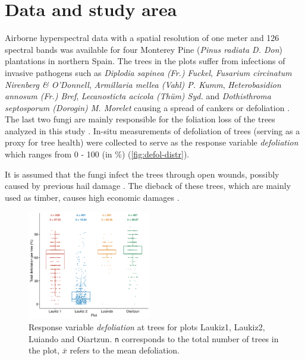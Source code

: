 \documentclass[peerreview]{IEEEtran}
\begin{document}
\section{Data and study area}

Airborne hyperspectral data with a spatial resolution of one meter and 126 spectral bands was available for four Monterey Pine (\textit{Pinus radiata D. Don}) plantations in northern Spain.
The trees in the plots suffer from infections of invasive pathogens such as \textit{Diplodia sapinea (Fr.) Fuckel}, \textit{Fusarium circinatum Nirenberg \& O'Donnell}, \textit{Armillaria mellea (Vahl) P. Kumm}, \textit{Heterobasidion annosum (Fr.) Bref}, \textit{Lecanosticta acicola (Thüm) Syd.} and \textit{Dothisthroma septosporum (Dorogin) M. Morelet} causing a spread of cankers or defoliation \cite{mesanza2016, iturritxa2017}.
The last two fungi are mainly responsible for the foliation loss of the trees analyzed in this study \cite{iturritxa2014}.
In-situ measurements of defoliation of trees (serving as a proxy for tree health) were collected to serve as the response variable \textit{defoliation} which ranges from 0 - 100 (in \%) (\autoref{fig:defol-distr}).

It is assumed that the fungi infect the trees through open wounds, possibly caused by previous hail damage \cite{iturritxa2014}.
The dieback of these trees, which are mainly used as timber, causes high economic damages \cite{ganley2009}.

\begin{figure} [t!]
	\centering
	\begin{center}
		\includegraphics[width=0.48\textwidth] {defoliation-distribution-plot-1.pdf}
		\caption{Response variable \textit{defoliation} at trees for plots Laukiz1, Laukiz2, Luiando and Oiartzun. \texttt{n} corresponds to the total number of trees in the plot, $\bar{x}$ refers to the mean defoliation.}\label{fig:defol-distr}
	\end{center}
\end{figure}
\end{document}
